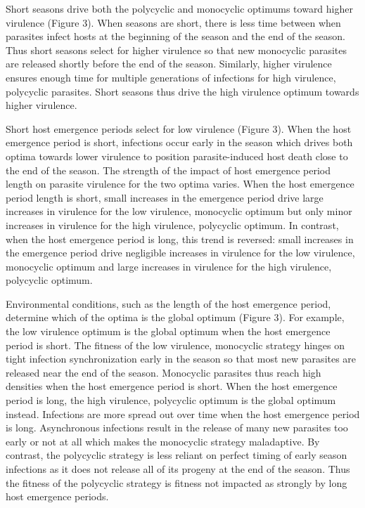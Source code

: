 \documentclass{article}
\begin{document}
Short seasons drive both the polycyclic and monocyclic optimums toward higher virulence (Figure 3). When seasons are short, there is less time between when parasites infect hosts at the beginning of the season and the end of the season. Thus short seasons select for higher virulence so that new monocyclic parasites are released shortly before the end of the season.
Similarly, higher virulence ensures enough time for multiple generations of infections for high virulence, polycyclic parasites. Short seasons thus drive the high virulence optimum towards higher virulence.

Short host emergence periods select for low virulence (Figure 3). When the host emergence period is short, infections occur early in the season which drives both optima towards lower virulence to position parasite-induced host death close to the end of the season. The strength of the impact of host emergence period length on parasite virulence for the two optima varies. When the host emergence period length is short, small increases in the emergence period drive large increases in virulence for the low virulence, monocyclic optimum but only minor increases in virulence for the high virulence, polycyclic optimum. In contrast, when the host emergence period is long, this trend is reversed: small increases in the emergence period drive negligible increases in virulence for the low virulence, monocyclic optimum and large increases in virulence for the high virulence, polycyclic optimum. 

Environmental conditions, such as the length of the host emergence period, determine which of the optima is the global optimum (Figure 3). For example, the low virulence optimum is the global optimum when the host emergence period is short. The fitness of the low virulence, monocyclic strategy hinges on tight infection synchronization early in the season so that most new parasites are released near the end of the season. Monocyclic parasites thus reach high densities when the host emergence period is short. 
When the host emergence period is long, the high virulence, polycyclic optimum is the global optimum instead. Infections are more spread out over time when the host emergence period is long. Asynchronous infections result in the release of many new parasites too early or not at all which makes the monocyclic strategy maladaptive. By contrast, the polycyclic strategy is less reliant on perfect timing of early season infections as it does not release all of its progeny at the end of the season. Thus the fitness of the polycyclic strategy is fitness not impacted as strongly by long host emergence periods. 
\end{document}

